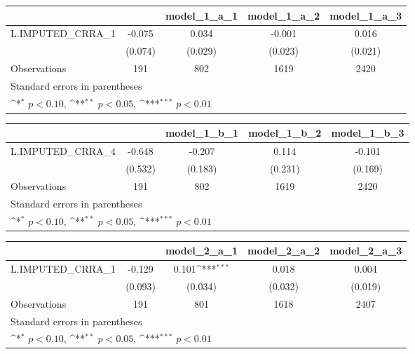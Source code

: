{
\def\sym#1{\ifmmode^{#1}\else\(^{#1}\)\fi}
\begin{tabular}{l*{4}{c}}
\toprule
                &\multicolumn{1}{c}{}&\multicolumn{1}{c}{model\_1\_a\_1}&\multicolumn{1}{c}{model\_1\_a\_2}&\multicolumn{1}{c}{model\_1\_a\_3}\\
\midrule
L.IMPUTED\_CRRA\_1&   -0.075         &    0.034         &   -0.001         &    0.016         \\
                &  (0.074)         &  (0.029)         &  (0.023)         &  (0.021)         \\
\midrule
Observations    &      191         &      802         &     1619         &     2420         \\
\bottomrule
\multicolumn{5}{l}{\footnotesize Standard errors in parentheses}\\
\multicolumn{5}{l}{\footnotesize \sym{*} \(p<0.10\), \sym{**} \(p<0.05\), \sym{***} \(p<0.01\)}\\
\end{tabular}
}
{
\def\sym#1{\ifmmode^{#1}\else\(^{#1}\)\fi}
\begin{tabular}{l*{4}{c}}
\toprule
                &\multicolumn{1}{c}{}&\multicolumn{1}{c}{model\_1\_b\_1}&\multicolumn{1}{c}{model\_1\_b\_2}&\multicolumn{1}{c}{model\_1\_b\_3}\\
\midrule
L.IMPUTED\_CRRA\_4&   -0.648         &   -0.207         &    0.114         &   -0.101         \\
                &  (0.532)         &  (0.183)         &  (0.231)         &  (0.169)         \\
\midrule
Observations    &      191         &      802         &     1619         &     2420         \\
\bottomrule
\multicolumn{5}{l}{\footnotesize Standard errors in parentheses}\\
\multicolumn{5}{l}{\footnotesize \sym{*} \(p<0.10\), \sym{**} \(p<0.05\), \sym{***} \(p<0.01\)}\\
\end{tabular}
}
{
\def\sym#1{\ifmmode^{#1}\else\(^{#1}\)\fi}
\begin{tabular}{l*{4}{c}}
\toprule
                &\multicolumn{1}{c}{}&\multicolumn{1}{c}{model\_2\_a\_1}&\multicolumn{1}{c}{model\_2\_a\_2}&\multicolumn{1}{c}{model\_2\_a\_3}\\
\midrule
L.IMPUTED\_CRRA\_1&   -0.129         &    0.101\sym{***}&    0.018         &    0.004         \\
                &  (0.093)         &  (0.034)         &  (0.032)         &  (0.019)         \\
\midrule
Observations    &      191         &      801         &     1618         &     2407         \\
\bottomrule
\multicolumn{5}{l}{\footnotesize Standard errors in parentheses}\\
\multicolumn{5}{l}{\footnotesize \sym{*} \(p<0.10\), \sym{**} \(p<0.05\), \sym{***} \(p<0.01\)}\\
\end{tabular}
}
